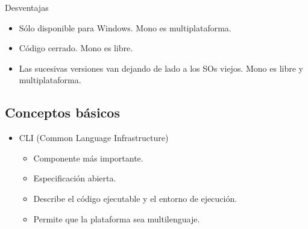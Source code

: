 \documentclass{beamer}
\begin{document}
\begin{frame}{Desventajas}
  \begin{itemize}
    \item \alert{Sólo disponible para Windows.} Mono es multiplataforma.
    \item \alert{Código cerrado.} Mono es libre.
    \item \alert{Las sucesivas versiones van dejando de lado a los SOs viejos.}
      Mono es libre y multiplataforma.
  \end{itemize}
\end{frame}


\subsection{Conceptos básicos}

\begin{frame}%

  \begin{itemize}
    \item CLI (Common Language Infrastructure)
      \begin{itemize}
        \item Componente más importante.
        \item Especificación abierta.
        \item Describe el código ejecutable y el entorno de ejecución.
        \item Permite que la plataforma sea multilenguaje.
      \end{itemize}
  \end{itemize}
\end{frame}

\begin{frame}[plain]
  \begin{centering}
  \end{centering}
\end{frame}
\end{document}
